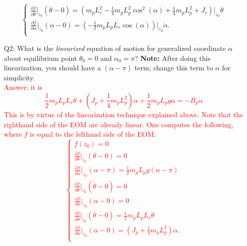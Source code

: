 \documentclass[12pt]{report}
\newcommand\drew[1]{\textcolor{red}{#1}}
\newcommand{\pder}[2]{\frac{\partial #1}{\partial #2}}
\begin{document}
\begin{enumerate}
{\[\begin{cases}
                      \pder{f}{\dot{\theta}}\big|_{z_0} (\ddot{\theta}-0)= \left(m_pL_r^2-\frac{1}{4}m_pL_p^2\cos^2(\alpha)+\frac{1}{4}m_pL_p^2+J_r \right)\big|_{z_0}\ddot{\theta} \\
                      \pder{f}{\dot{\alpha}}\big|_{z_0} (\ddot{\alpha}-0)= \left(-\frac{1}{2}m_pL_pL_r\cos{(\alpha)}\right)\big|_{z_0} \ddot{\alpha}.                               \\
                  \end{cases}
              \]
          }
    \item[Q2:] What is the \emph{linearized} equation of motion for generalized coordinate $\alpha$ about equilibrium point $\theta_0 = 0$ and $\alpha_0 = \pi$? \textbf{Note:} After doing this linearization, you should have a $(\alpha-\pi)$ term; change this term to $\alpha$ for simplicity. \\
          \drew{Answer: it is
              \[
                  \frac{1}{2} m_p L_p L_r \ddot{\theta} + \left(J_p + \frac{1}{4} m_p L_{p}^{2}\right)\ddot{\alpha} + \frac{1}{2} m_p L_{p} g \alpha = - B_p \dot{\alpha}
              \]
              This is by virtue of the linearization technique explained above. Note that the righthand side of the EOM are already linear. One computes the following, where $f$ is equal to the lefthand side of the EOM:
              \[
                  \begin{cases}
                      f(z_0) = 0                                                                                              \\
                      \pder{f}{\theta}\big|_{z_0} (\theta-0) = 0                                                              \\
                      \pder{f}{\alpha}\big|_{z_0} (\alpha-\pi) = \frac{1}{2}m_pL_pg(\alpha-\pi)                               \\
                      \pder{f}{\dot{\theta}}\big|_{z_0} (\dot{\theta}-0) = 0                                                  \\
                      \pder{f}{\dot{\alpha}}\big|_{z_0} (\dot{\alpha}-0)= 0                                                   \\
                      \pder{f}{\dot{\theta}}\big|_{z_0} (\ddot{\theta}-0)= \frac{1}{2}m_pL_pL_r\ddot{\theta}                  \\
                      \pder{f}{\dot{\alpha}}\big|_{z_0} (\ddot{\alpha}-0)= \left(J_p+\frac{1}{4}m_pL_p^2\right)\ddot{\alpha}. \\

\end{cases}\]}
\end{enumerate}
\end{document}
